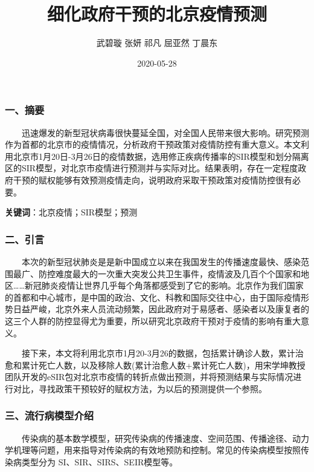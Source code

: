 \documentclass[12pt,a5paper,]{article}
\title{细化政府干预的北京疫情预测}
\author{武碧璇 张妍 祁凡 屈亚然 丁晨东}
\date{2020-05-28}
\begin{document}
\maketitle

\hypertarget{ux4e00ux6458ux8981}{%
\subsubsection{一、摘要}\label{ux4e00ux6458ux8981}}

  迅速爆发的新型冠状病毒很快蔓延全国，对全国人民带来很大影响。研究预测作为首都的北京市的疫情情况，分析政府干预政策对疫情防控有重大意义。本文利用北京市1月20日-3月26日的疫情数据，选用修正疾病传播率的SIR模型和划分隔离区的SIR模型，对北京市疫情进行预测并与实际对比。结果表明，存在一定程度政府干预的赋权能够有效预测疫情走向，说明政府采取干预政策对疫情防控很有必要。

\textbf{关键词}：北京疫情；SIR模型；预测

\hypertarget{ux4e8cux5f15ux8a00}{%
\subsubsection{二、引言}\label{ux4e8cux5f15ux8a00}}

  本次的新型冠状肺炎是是新中国成立以来在我国发生的传播速度最快、感染范围最广、防控难度最大的一次重大突发公共卫生事件，疫情波及几百个个国家和地区\ldots{}\ldots{}新冠肺炎疫情让世界几乎每个角落都感受到了它的影响。北京作为我们国家的首都和中心城市，是中国的政治、文化、科教和国际交往中心，由于国际疫情形势日益严峻，北京外来人员流动频繁，因此政府对于易感者、感染者以及康复者的这三个人群的防控显得尤为重要，所以研究北京政府干预对于疫情的影响有重大意义。

  接下来，本文将利用北京市1月20-3月26的数据，包括累计确诊人数，累计治愈和累计死亡人数，以及移除人数(累计治愈人数+累计死亡人数)，用宋学坤教授团队开发的eSIR包对北京市疫情的转折点做出预测，并将预测结果与实际情况进行对比，寻找政策干预较好的赋权方法，为以后的预测提供一个参照。

\hypertarget{ux4e09ux6d41ux884cux75c5ux6a21ux578bux4ecbux7ecd}{%
\subsubsection{三、流行病模型介绍}\label{ux4e09ux6d41ux884cux75c5ux6a21ux578bux4ecbux7ecd}}

  传染病的基本数学模型，研究传染病的传播速度、空间范围、传播途径、动力学机理等问题，用来指导对传染病的有效地预防和控制。常见的传染病模型按照传染病类型分为
SI、SIR、SIRS、SEIR模型等。
\end{document}
